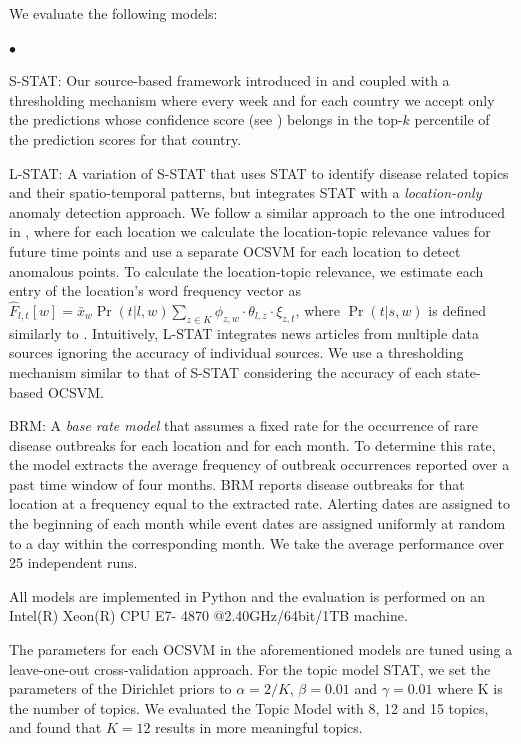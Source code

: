 \documentclass[conference]{IEEEtran}
\newcommand{\squishlist}{
   \begin{list}{$\bullet$}
    {
      \setlength{\itemsep}{0pt}
      \setlength{\parsep}{3pt}
      \setlength{\topsep}{3pt}
      \setlength{\partopsep}{0pt}
      \setlength{\leftmargin}{1.5em}
      \setlength{\labelwidth}{1em}
      \setlength{\labelsep}{0.5em} } }
\newcommand{\squishend}{
    \end{list}  }
\newcommand{\model}{{STAT}\xspace} %
\newcommand{\fullmodel}{{S-STAT}\xspace}
\newcommand{\locationmodel}{{L-STAT}\xspace}
\begin{document}
 We evaluate the following models:
\squishlist
\item \fullmodel: Our source-based framework introduced in  and  coupled with a thresholding mechanism where every week and for each country we accept only the predictions whose confidence score (see ) belongs in the top-$k$ percentile of the prediction scores for that country.
\item \locationmodel: A variation of \fullmodel that uses \model to identify disease related topics and their spatio-temporal patterns, but integrates \model with a {\em location-only} anomaly detection approach. We follow a similar approach to the one introduced in , where for each location we calculate the location-topic relevance values for future time points and use a separate OCSVM for each location to detect anomalous points. To calculate the location-topic relevance, we estimate each entry of the location's word frequency vector as $\hat{F}_{l,t}[w] = \bar{x}_{w} \Pr(t|l,w) \sum_{z \in K}\phi_{z,w}\cdot \theta_{l,z} \cdot \xi_{z,t}$, where $\Pr(t|s,w)$ is defined similarly to . Intuitively,  \locationmodel integrates news articles from multiple data sources ignoring the accuracy of individual sources. We use a thresholding mechanism similar to that of \fullmodel considering the accuracy of each state-based OCSVM. 
\item BRM: A {\em base rate model} that assumes a fixed rate for the occurrence of rare disease outbreaks for each location and for each
month. To determine this rate, the model extracts the average frequency of outbreak occurrences reported over a past time window of four months. BRM reports disease outbreaks for that location at a frequency equal to the extracted rate. Alerting dates are assigned to the beginning of each month while event dates are assigned uniformly at random to a day within the corresponding month. We take the average performance over 25 independent runs.
\squishend
All models are implemented in Python and the evaluation is performed on an Intel(R) Xeon(R) CPU E7- 4870 @2.40GHz/64bit/1TB machine. 


 The parameters for each OCSVM in the aforementioned models are tuned using a leave-one-out cross-validation approach. For the topic model \model, we set the parameters of the Dirichlet priors to $\alpha = 2/K$, $\beta = 0.01$ and $\gamma = 0.01$ where K is the number of topics. We evaluated the Topic Model with 8, 12 and 15 topics, and found that $K=12$ results in more meaningful topics.  
\end{document}
